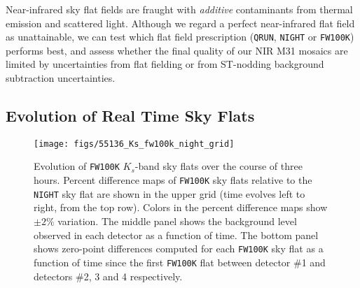 \documentclass[iop,tighten]{emulateapj}
\newcommand{\Sec}[1]{\S\ref{sec:#1}}  %
\begin{document}
Near-infrared sky flat fields are fraught with \emph{additive} contaminants from thermal emission and scattered light.
Although we regard a perfect near-infrared flat field as unattainable, we can test which flat field prescription (\texttt{QRUN}, \texttt{NIGHT} or \texttt{FW100K}) performs best, and assess whether the final quality of our NIR M31 mosaics are limited by uncertainties from flat fielding or from ST-nodding background subtraction uncertainties.


\subsection{Evolution of Real Time Sky Flats}
\label{sec:flatevo}

\begin{figure*}[t]
\centering
\texttt{[image: figs/55136\_Ks\_fw100k\_night\_grid]}
\caption{
Evolution of \texttt{FW100K} $K_s$-band sky flats over the course of three hours.
Percent difference maps of \texttt{FW100K} sky flats relative to the \texttt{NIGHT} sky flat are shown in the upper grid (time evolves left to right, from the top row).
Colors in the percent difference maps show $\pm2\%$ variation.
The middle panel shows the background level observed in each detector as a function of time.
The bottom panel shows zero-point differences computed for each \texttt{FW100K} sky flat as a function of time since the first \texttt{FW100K} flat between detector \#1 and detectors \#2, 3 and 4 respectively.
}
\label{fig:fw100k_movie}
\end{figure*}

\end{document}

